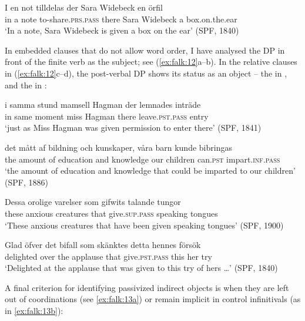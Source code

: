 \documentclass[output=paper]{langscibook}
\begin{document}
\ex\label{ex:falk:11b}
\gll I  en  not  tilldelas            der  Sara  Widebeck  en  örfil\\
      in  a  note  to-share\textsc{.prs}.\textsc{pass}    there  Sara  Widebeck  a  box.on.the.ear\\
\glt ‘In a note, Sara Widebeck is given a box on the ear’ (SPF, 1840)
\z
\z


In embedded clauses that do not allow  word order, I have analysed the DP in front of the finite verb as the subject; see (\ref{ex:falk:12}a–b). In the relative clauses in (\ref{ex:falk:12}c–d), the post-verbal DP shows its status as an object – the  in , and the  in :

\ea%
    \label{ex:falk:12}
\ea\label{ex:falk:12a}
\gll i  samma  stund    mamsell  Hagman  der    lemnades      inträde\\
      in  same    moment miss    Hagman  there  leave\textsc{.pst}.\textsc{pass}     entry\\
\glt ‘just as Miss Hagman was given permission to enter there’ (SPF, 1841)

\ex \label{ex:falk:12b}
\gll det  mått      af  bildning    och  kunskaper,  våra  barn    kunde bibringas\\
      the  amount  of  education  and  knowledge  our  children  can.\textsc{pst}     impart.\textsc{inf}.\textsc{pass}\\
\glt ‘the amount of education and knowledge that could be imparted to our children’ (SPF, 1886)

\ex \label{ex:falk:12c}
\gll Dessa  orolige  varelser   som  gifwits      talande    tungor\\
      these    anxious  creatures that  give\textsc{.sup.pass}  speaking  tongues\\
\glt ‘These anxious creatures that have been given speaking tongues’ (SPF, 1900)

\ex \label{ex:falk:12d}
\gll Glad        öfver  det  bifall    som  skänktes      detta  hennes  försök\\
      delighted  over  the  applause    that  give\textsc{.pst}.\textsc{pass}  this  her    try\\
\glt ‘Delighted at the applause that was given to this try of hers …’ (SPF, 1840)
\z
\z


A final criterion for identifying passivized indirect objects is when they are left out of coordinations (see \ref{ex:falk:13a}) or remain implicit in control infinitivals (as in \ref{ex:falk:13b}):
\end{document}
